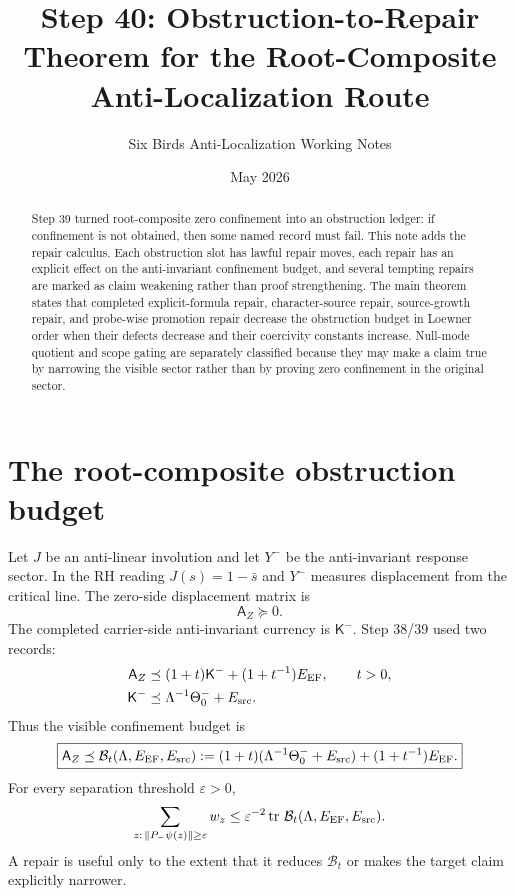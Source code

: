 \documentclass[11pt]{article}
\title{Step 40: Obstruction-to-Repair Theorem for the Root-Composite Anti-Localization Route}
\author{Six Birds Anti-Localization Working Notes}
\date{May 2026}
\newcommand{\AZ}{\mathsf A_Z}
\newcommand{\Kminus}{\mathsf K^-}
\newcommand{\ThetaZero}{\Theta^-_0}
\newcommand{\EEF}{E_{\rm EF}}
\newcommand{\Esrc}{E_{\rm src}}
\newcommand{\Loewner}{\preceq}
\newcommand{\tr}{\operatorname{tr}}
\begin{document}
\maketitle

\begin{abstract}
Step 39 turned root-composite zero confinement into an obstruction ledger: if confinement is not obtained, then some named record must fail.  This note adds the repair calculus.  Each obstruction slot has lawful repair moves, each repair has an explicit effect on the anti-invariant confinement budget, and several tempting repairs are marked as claim weakening rather than proof strengthening.  The main theorem states that completed explicit-formula repair, character-source repair, source-growth repair, and probe-wise promotion repair decrease the obstruction budget in Loewner order when their defects decrease and their coercivity constants increase.  Null-mode quotient and scope gating are separately classified because they may make a claim true by narrowing the visible sector rather than by proving zero confinement in the original sector.
\end{abstract}

\section{The root-composite obstruction budget}

Let $J$ be an anti-linear involution and let $Y^-$ be the anti-invariant response sector.  In the RH reading $J(s)=1-\bar s$ and $Y^-$ measures displacement from the critical line.  The zero-side displacement matrix is
\[
  \AZ\succeq 0.
\]
The completed carrier-side anti-invariant currency is $\Kminus$.  Step 38/39 used two records:
\begin{align}
  \AZ &\Loewner (1+t)\Kminus+(1+t^{-1})\EEF,\qquad t>0,\label{eq:efdef}\\
  \Kminus &\Loewner \Lambda^{-1}\ThetaZero+\Esrc.\label{eq:srcdef}
\end{align}
Thus the visible confinement budget is
\begin{equation}
  \boxed{
  \AZ\Loewner \mathcal B_t(\Lambda,\EEF,\Esrc)
  :=(1+t)(\Lambda^{-1}\ThetaZero+\Esrc)+(1+t^{-1})\EEF .
  }
  \label{eq:budget}
\end{equation}
For every separation threshold $\varepsilon>0$,
\begin{equation}
  \sum_{z:\,\|P_-\psi(z)\|\ge \varepsilon} w_z
  \le
  \varepsilon^{-2}\tr\,\mathcal B_t(\Lambda,\EEF,\Esrc).
\end{equation}
A repair is useful only to the extent that it reduces $\mathcal B_t$ or makes the target claim explicitly narrower.
\end{document}

